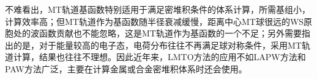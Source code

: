 不难看出，MT轨道基函数特别适用于满足密堆积条件的体系计算，所需基组小，计算效率高；但MT轨道作为基函数随半径衰减缓慢，距离中心MT球很远的WS原胞处的波函数贡献也不能忽略，这是MT轨道作为基函数的一个不足；另外需要指出的是，对于能量较高的电子态，电荷分布往往不再满足球对称条件，采用MT轨道计算，结果也往往不理想。因此近年来，LMTO方法的应用不如LAPW方法和PAW方法广泛，主要在计算金属或合金密堆积体系时还会使用。




